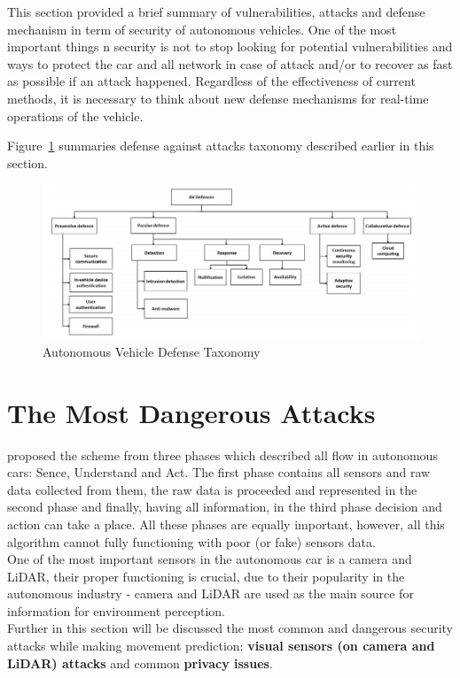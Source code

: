 This section provided a brief summary of vulnerabilities, attacks and defense mechanism in term of security of autonomous vehicles. One of the most important things n security is not to stop looking for potential vulnerabilities and ways to protect the car and all network in case of attack and/or to recover as fast as possible if an attack happened. Regardless of the effectiveness of current methods, it is necessary to think about new defense mechanisms for real-time operations of the vehicle. 	

Figure~\ref{fig:DefenseTaxonomy} summaries defense against attacks taxonomy described earlier in this section.

\begin{figure}[h]
	\centering  	
	\includegraphics[width=15cm]{img/7.jpg}
	\caption{Autonomous Vehicle Defense Taxonomy \cite{sec}}
	\label{fig:DefenseTaxonomy}    
\end{figure}

\section{The Most Dangerous Attacks}

\cite{AttacksOnSensors} proposed the scheme from three phases which described all flow in autonomous cars: Sence, Understand and Act. The first phase contains all sensors and raw data collected from them, the raw data is proceeded and represented in the second phase and finally, having all information, in the third phase decision and action can take a place. All these phases are equally important, however, all this algorithm cannot fully functioning with poor (or fake) sensors data. \\
One of the most important sensors in the autonomous car is a camera and \gls{LiDAR}, their proper functioning is crucial, due to their popularity in the autonomous industry - camera and \gls{LiDAR} are used as the main source for information for environment perception. \\
Further in this section will be discussed the most common and dangerous security attacks while making movement prediction: \textbf{visual sensors (on camera and \gls{LiDAR}) attacks} and common \textbf{privacy issues}.

